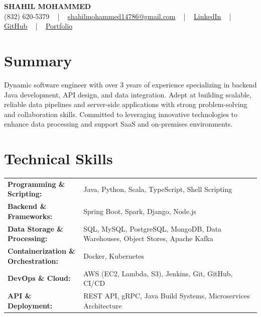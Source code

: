 \documentclass[letterpaper,11pt]{article}
\begin{document}
\begin{center}
    {\fontsize{14pt}{12pt}\selectfont \textbf{\MakeUppercase{Shahil Mohammed}}}\\ \vspace{2pt}
    \fontsize{10pt}{12pt}\selectfont (832) 620-5379 ~ | ~ \href{mailto:shahilmohammed14786@gmail.com}{shahilmohammed14786@gmail.com} ~ | ~  
    \href{https://www.linkedin.com/in/shahil-mohammed-9652931a1/}{\color{blue}\underline{LinkedIn}}  ~ | ~ 
    \href{https://github.com/freakbeast14}{\color{blue}\underline{GitHub}} ~ | ~ 
    \href{https://shahil-mohammed.netlify.app/}{\color{blue}\underline{Portfolio}}
    \vspace{-8pt}
\end{center}

\section{Summary}
\fontsize{9pt}{10pt}\selectfont
Dynamic software engineer with over 3 years of experience specializing in backend Java development, API design, and data integration. Adept at building scalable, reliable data pipelines and server-side applications with strong problem-solving and collaboration skills. Committed to leveraging innovative technologies to enhance data processing and support SaaS and on-premises environments.
 \vspace{-5pt}
 
\section{Technical Skills}
        \vspace{-14pt}
        \begin{table}[h]
            \fontsize{9pt}{10pt}\selectfont
            \begin{tabular}{p{0.3\linewidth} p{0.7\linewidth}}
                \textbf{Programming \& Scripting:} & Java, Python, Scala, TypeScript, Shell Scripting \\
                \textbf{Backend \& Frameworks:} & Spring Boot, Spark, Django, Node.js \\
                \textbf{Data Storage \& Processing:} & SQL, MySQL, PostgreSQL, MongoDB, Data Warehouses, Object Stores, Apache Kafka \\
                \textbf{Containerization \& Orchestration:} & Docker, Kubernetes \\
                \textbf{DevOps \& Cloud:} & AWS (EC2, Lambda, S3), Jenkins, Git, GitHub, CI/CD \\
                \textbf{API \& Deployment:} & REST API, gRPC, Java Build Systems, Microservices Architecture \\
            \end{tabular}
        \end{table}
 \vspace{-15pt}
 
\end{document}

